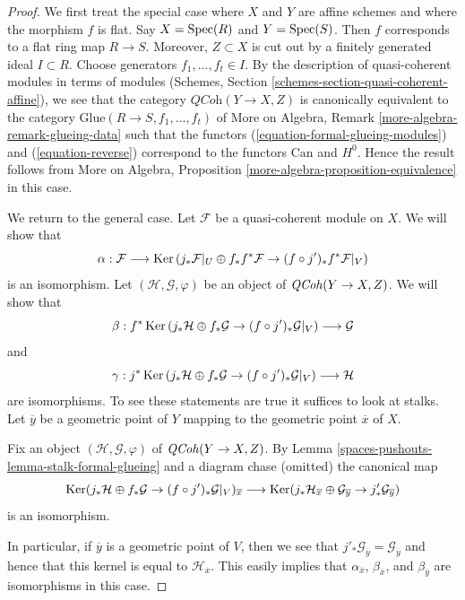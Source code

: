 \begin{proof}
We first treat the special case where $X$ and $Y$ are affine schemes
and where the morphism $f$ is flat. Say $X = \operatorname{Spec}(R)$ and $Y = \operatorname{Spec}(S)$.
Then $f$ corresponds to a flat ring map $R \to S$. Moreover, $Z \subset X$
is cut out by a finitely generated ideal $I \subset R$. Choose generators
$f_1, \ldots, f_t \in I$. By the description of quasi-coherent modules
in terms of modules
(Schemes, Section \ref{schemes-section-quasi-coherent-affine}),
we see that the category $\textit{QCoh}(Y \to X, Z)$
is canonically equivalent to the category
$\text{Glue}(R \to S, f_1, \ldots, f_t)$
of More on Algebra, Remark \ref{more-algebra-remark-glueing-data}
such that the functors
(\ref{equation-formal-glueing-modules}) and (\ref{equation-reverse})
correspond to the functors $\text{Can}$ and $H^0$.
Hence the result follows from
More on Algebra, Proposition \ref{more-algebra-proposition-equivalence}
in this case.

\medskip\noindent
We return to the general case.
Let $\mathcal{F}$ be a quasi-coherent module on $X$.
We will show that
$$
\alpha :
\mathcal{F}
\longrightarrow
\operatorname{Ker}\left(j_*\mathcal{F}|_U \oplus f_*f^*\mathcal{F} \to
(f \circ j')_*f^*\mathcal{F}|_V\right)
$$
is an isomorphism. Let $(\mathcal{H}, \mathcal{G}, \varphi)$
be an object of $\mathit{QCoh}(Y \to X, Z)$. We will show that
$$
\beta :
f^*\operatorname{Ker}\left(
j_*\mathcal{H} \oplus f_*\mathcal{G} \to (f \circ j')_*\mathcal{G}|_V
\right)
\longrightarrow
\mathcal{G}
$$
and
$$
\gamma :
j^*\operatorname{Ker}\left(
j_*\mathcal{H} \oplus f_*\mathcal{G} \to (f \circ j')_*\mathcal{G}|_V
\right)
\longrightarrow
\mathcal{H}
$$
are isomorphisms. To see these statements are true it suffices to
look at stalks. Let $\overline{y}$ be a geometric point of $Y$ mapping
to the geometric point $\overline{x}$ of $X$.

\medskip\noindent
Fix an object $(\mathcal{H}, \mathcal{G}, \varphi)$ of $\mathit{QCoh}(Y \to X, Z)$.
By Lemma \ref{spaces-pushouts-lemma-stalk-formal-glueing}
and a diagram chase (omitted) the canonical map
$$
\operatorname{Ker}(j_*\mathcal{H} \oplus f_*\mathcal{G} \to
(f \circ j')_*\mathcal{G}|_V)_{\overline{x}}
\longrightarrow
\operatorname{Ker}(
j_*\mathcal{H}_{\overline{x}} \oplus \mathcal{G}_{\overline{y}}
\to
j'_*\mathcal{G}_{\overline{y}}
)
$$
is an isomorphism.

\medskip\noindent
In particular, if $\overline{y}$ is a geometric point of $V$, then
we see that $j'_*\mathcal{G}_{\overline{y}} = \mathcal{G}_{\overline{y}}$
and hence that this kernel is equal to $\mathcal{H}_{\overline{x}}$.
This easily implies that $\alpha_{\overline{x}}$, $\beta_{\overline{x}}$,
and $\beta_{\overline{y}}$ are isomorphisms in this case.


\end{proof}
